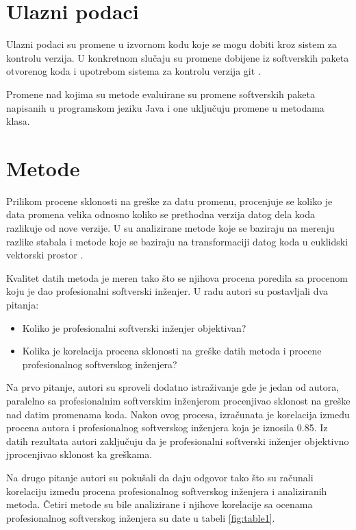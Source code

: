 \documentclass[twocolumns]{article}
\begin{document}
\section{Ulazni podaci}
\label{sec:input_data}

Ulazni podaci su promene u izvornom kodu koje se mogu dobiti kroz sistem za kontrolu verzija. U konkretnom slučaju su promene dobijene iz softverskih paketa otvorenog koda i upotrebom sistema za kontrolu verzija git \cite{spinellis2012git}. 

Promene nad kojima su metode evaluirane su promene softverskih paketa napisanih u programskom jeziku Java i one uključuju promene u metodama klasa. 

\section{Metode}
\label{sec:methods}

Prilikom procene sklonosti na greške za datu promenu, procenjuje se koliko je data promena velika odnosno koliko se prethodna verzija datog dela koda razlikuje od nove verzije. U \cite{altiero2023ai} su analizirane metode koje se baziraju na merenju razlike stabala \cite{moschitti2006making} i metode koje se baziraju na transformaciji datog koda u euklidski vektorski prostor \cite{feng2020codebert}. 

Kvalitet datih metoda je meren tako što se njihova procena poredila sa procenom koju je dao profesionalni softverski inženjer. U radu autori su postavljali dva pitanja:

\begin{itemize}
  \item Koliko je profesionalni softverski inženjer objektivan?
  \item Kolika je korelacija procena sklonosti na greške datih metoda i procene profesionalnog softverskog inženjera?
\end{itemize}


Na prvo pitanje, autori su sproveli dodatno istraživanje gde je jedan od autora, paralelno sa profesionalnim softverskim inženjerom procenjivao sklonost na greške nad datim promenama koda. Nakon ovog procesa, izračunata je korelacija između procena autora i profesionalnog softverskog inženjera koja je iznosila 0.85. Iz datih rezultata autori zaključuju da je profesionalni softverski inženjer objektivno jprocenjivao sklonost ka greškama. 

Na drugo pitanje autori su pokušali da daju odgovor tako što su računali korelaciju između procena profesionalnog softverskog inženjera i analiziranih metoda. Četiri metode su bile analizirane i njihove korelacije sa ocenama profesionalnog softverskog inženjera su date u tabeli \ref{fig:table1}.
\end{document}
